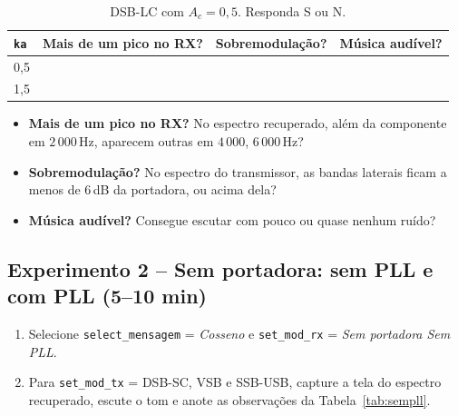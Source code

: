 \documentclass[11pt,a4paper]{article}
\begin{document}
\begin{table}[H]
      \centering
      \begin{tabular}{l c c c}
            \toprule
            \texttt{ka} & \textbf{Mais de um pico no RX?} & \textbf{Sobremodulação?} & \textbf{Música audível?} \\
            \midrule
            0,5         &                                 &                          &                          \\
            1,5         &                                 &                          &                          \\
            \bottomrule
      \end{tabular}
      \caption{DSB-LC com $A_c = 0{,}5$. Responda S ou N.}
      \label{tab:exp1}
\end{table}

\begin{atencao}
      \begin{itemize}[leftmargin=*]
            \item \textbf{Mais de um pico no RX?} No espectro recuperado, além da
                  componente em $2\,000$\,Hz, aparecem outras em $4\,000$, $6\,000$\,Hz?
            \item \textbf{Sobremodulação?} No espectro do transmissor, as bandas
                  laterais ficam a menos de 6\,dB da portadora, ou acima dela?
            \item \textbf{Música audível?} Consegue escutar com pouco ou quase nenhum ruído?
      \end{itemize}
\end{atencao}

\subsection*{Experimento 2 -- Sem portadora: sem PLL e com PLL (5--10 min)}

\begin{instrucao}
      \begin{enumerate}[label=\arabic*.]
            \item Selecione \texttt{select\_mensagem} = \emph{Cosseno} e
                  \texttt{set\_mod\_rx} = \emph{Sem portadora Sem PLL}.
            \item Para \texttt{set\_mod\_tx} = DSB-SC, VSB e SSB-USB, capture a tela
                  do espectro recuperado, escute o tom e anote as observações da
                  Tabela~\ref{tab:sempll}.
      \end{enumerate}
\end{instrucao}
\end{document}
